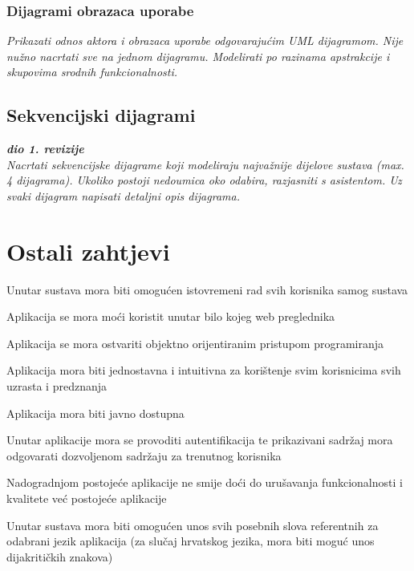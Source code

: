 				\subsubsection{Dijagrami obrazaca uporabe}
					
					\textit{Prikazati odnos aktora i obrazaca uporabe odgovarajućim UML dijagramom. Nije nužno nacrtati sve na jednom dijagramu. Modelirati po razinama apstrakcije i skupovima srodnih funkcionalnosti.}
				\eject		
				
			\subsection{Sekvencijski dijagrami}
				
				\textbf{\textit{dio 1. revizije}}\\
				
				\textit{Nacrtati sekvencijske dijagrame koji modeliraju najvažnije dijelove sustava (max. 4 dijagrama). Ukoliko postoji nedoumica oko odabira, razjasniti s asistentom. Uz svaki dijagram napisati detaljni opis dijagrama.}
				\eject
	
		\section{Ostali zahtjevi}
		 
			  \begin{packed_item}
			 	\item Unutar sustava mora biti omogućen istovremeni rad svih korisnika samog sustava
			 	\item Aplikacija se mora moći koristit unutar bilo kojeg web preglednika 
			 	\item Aplikacija se mora ostvariti objektno orijentiranim pristupom programiranja
			 	\item Aplikacija mora biti jednostavna i intuitivna za korištenje svim korisnicima svih uzrasta i predznanja
			 	\item Aplikacija mora biti javno dostupna
			 	\item Unutar aplikacije mora se provoditi autentifikacija te prikazivani sadržaj mora odgovarati dozvoljenom sadržaju za trenutnog korisnika
			 	\item Nadogradnjom postojeće aplikacije ne smije doći do urušavanja funkcionalnosti i kvalitete već postojeće aplikacije
			 	\item Unutar sustava mora biti omogućen unos svih posebnih slova referentnih za odabrani jezik aplikacija (za slučaj hrvatskog jezika, mora biti moguć unos dijakritičkih znakova)
			 \end{packed_item}
			 
			 
			 
	